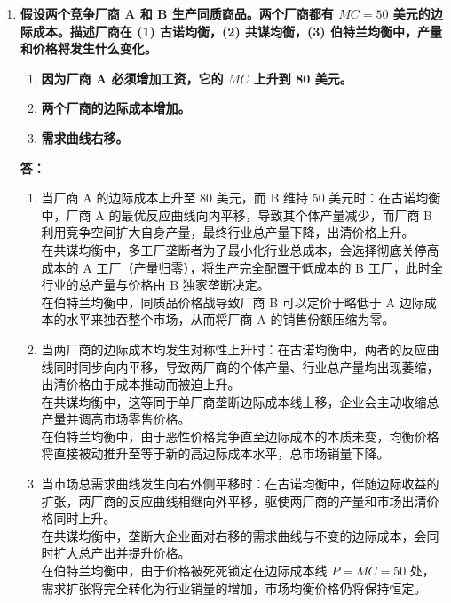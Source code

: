 \begin{enumerate}[label=\textbf{\arabic*.}, leftmargin=*]
\begin{center}
		\end{center}
		
		\item \textbf{假设两个竞争厂商 A 和 B 生产同质商品。两个厂商都有 $MC = 50$ 美元的边际成本。描述厂商在 (1) 古诺均衡，(2) 共谋均衡，(3) 伯特兰均衡中，产量和价格将发生什么变化。}
		
		\begin{enumerate}
			\item \textbf{因为厂商 A 必须增加工资，它的 $MC$ 上升到 80 美元。}
			\item \textbf{两个厂商的边际成本增加。}
			\item \textbf{需求曲线右移。}
		\end{enumerate}
		
		\textbf{答：}
		\begin{enumerate}
			\item[(1)] 当厂商 A 的边际成本上升至 80 美元，而 B 维持 50 美元时：在古诺均衡中，厂商 A 的最优反应曲线向内平移，导致其个体产量减少，而厂商 B 利用竞争空间扩大自身产量，最终行业总产量下降，出清价格上升。\\在共谋均衡中，多工厂垄断者为了最小化行业总成本，会选择彻底关停高成本的 A 工厂（产量归零），将生产完全配置于低成本的 B 工厂，此时全行业的总产量与价格由 B 独家垄断决定。\\在伯特兰均衡中，同质品价格战导致厂商 B 可以定价于略低于 A 边际成本的水平来独吞整个市场，从而将厂商 A 的销售份额压缩为零。
			
			\item[(2)] 当两厂商的边际成本均发生对称性上升时：在古诺均衡中，两者的反应曲线同时同步向内平移，导致两厂商的个体产量、行业总产量均出现萎缩，出清价格由于成本推动而被迫上升。\\在共谋均衡中，这等同于单厂商垄断边际成本线上移，企业会主动收缩总产量并调高市场零售价格。\\在伯特兰均衡中，由于恶性价格竞争直至边际成本的本质未变，均衡价格将直接被动推升至等于新的高边际成本水平，总市场销量下降。
			
			\item[(3)] 当市场总需求曲线发生向右外侧平移时：在古诺均衡中，伴随边际收益的扩张，两厂商的反应曲线相继向外平移，驱使两厂商的产量和市场出清价格同时上升。\\在共谋均衡中，垄断大企业面对右移的需求曲线与不变的边际成本，会同时扩大总产出并提升价格。\\在伯特兰均衡中，由于价格被死死锁定在边际成本线 $P = MC = 50$ 处，需求扩张将完全转化为行业销量的增加，市场均衡价格仍将保持恒定。
		\end{enumerate}
		

\end{enumerate}
